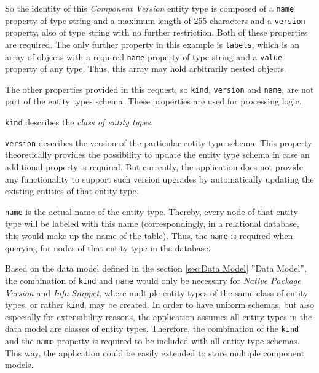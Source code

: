 So the identity of this \emph{Component Version} entity type is composed of a \lstinline|name| property of type string and a maximum length of 255 characters and a \lstinline|version| property, also of type string with no further restriction. Both of these properties are required. The only further property in this example is \lstinline|labels|, which is an array of objects with a required \lstinline|name| property of type string and a \lstinline|value| property of any type. Thus, this array may hold arbitrarily nested objects.\par 
The other properties provided in this request, so \lstinline|kind|, \lstinline|version| and \lstinline|name|, are not part of the entity types schema. These properties are used for processing logic.\par 
\lstinline|kind| describes the \emph{class of entity types}.\par 
\lstinline|version| describes the version of the particular entity type schema. This property theoretically provides the possibility to update the entity type schema in case an additional property is required. But currently, the application does not provide any functionality to support such version upgrades by automatically updating the existing entities of that entity type.\par 
\lstinline|name| is the actual name of the entity type. Thereby, every node of that entity type will be labeled with this name (correspondingly, in a relational database, this would make up the name of the table). Thus, the \lstinline|name| is required when querying for nodes of that entity type in the database.\par
Based on the data model defined in the section \ref{sec:Data Model} ''Data Model'', the combination of \lstinline|kind| and \lstinline|name| would only be necessary for \emph{Native Package Version} and \emph{Info Snippet}, where multiple entity types of the same class of entity types, or rather \lstinline|kind|, may be created. In order to have uniform schemas, but also especially for extensibility reasons, the application assumes all entity types in the data model are classes of entity types. Therefore, the combination of the \lstinline|kind| and the \lstinline|name| property is required to be included with all entity type schemas. This way, the application could be easily extended to store multiple component models.\\

